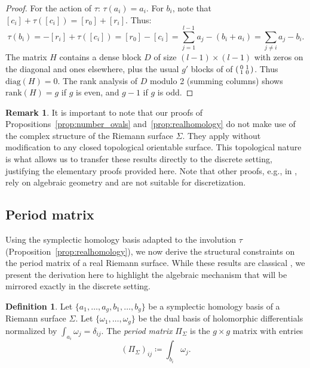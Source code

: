 \documentclass[11pt,a4paper]{article}
\theoremstyle{definition}
\newtheorem*{definition}{Definition}
\newtheorem*{remark}{Remark}
\begin{document}
\begin{proof}
For the action of $\tau$: $\tau(a_i) = a_i$. For $b_i$, note that $[c_i] + \tau([c_i]) = [r_0] + [r_i]$. Thus:
\[
\tau(b_i) = -[r_i] + \tau([c_i]) = [r_0] - [c_i] = \sum_{j=1}^{l-1} a_j - (b_i + a_i) = \sum_{j \neq i} a_j - b_i.
\]
The matrix $H$ contains a dense block $D$ of size $(l-1) \times (l-1)$ with zeros on the diagonal and ones elsewhere, plus the usual $g'$ blocks of of $\begin{psmallmatrix} 0 & 1 \\ 1 & 0 \end{psmallmatrix}$.
Thus $\mathrm{diag}(H) = 0$. The rank analysis of $D$ modulo 2 (summing columns) shows $\mathrm{rank}(H) = g$ if $g$ is even, and $g-1$ if $g$ is odd.
\end{proof}

\begin{remark}
	It is important to note that our proofs of Propositions~\ref{prop:number_ovals} and~\ref{prop:realhomology} do not make use of the complex structure of the Riemann surface $\Sigma$. They apply without modification to any closed topological orientable surface.
	This topological nature is what allows us to transfer these results directly to the discrete setting, justifying the elementary proofs provided here. Note that other proofs, e.g., in \cite{GH81}, rely on algebraic geometry and are not suitable for discretization.
\end{remark}

\subsection{Period matrix}\label{sec:periodmatrix}

Using the symplectic homology basis adapted to the involution $\tau$ (Proposition~\ref{prop:realhomology}), we now derive the structural constraints on the period matrix of a real Riemann surface. While these results are classical \cite{BBEIM94,Vin93}, we present the derivation here to highlight the algebraic mechanism that will be mirrored exactly in the discrete setting.

\begin{definition}
	Let $\{a_1,\ldots,a_g,b_1,\ldots,b_g\}$ be a symplectic homology basis of a Riemann surface $\Sigma$. Let $\{\omega_1, \ldots, \omega_g\}$ be the dual basis of holomorphic differentials normalized by $\int_{a_i} \omega_j=\delta_{ij}$. The \textit{period matrix} $\Pi_{\Sigma}$ is the $g \times g$ matrix with entries
	\[
	(\Pi_{\Sigma})_{ij} \coloneq \int_{b_i} \omega_j.
	\]
\end{definition}
\end{document}
